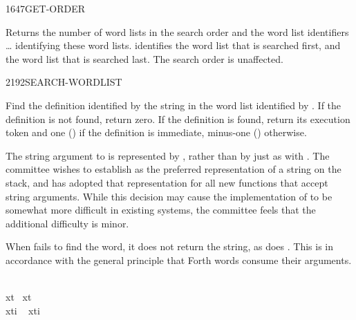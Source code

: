 \begin{worddef}{1647}{GET-ORDER}
\item {}

	Returns the number of word lists  in the search order
	and the word list identifiers  {\ldots} 
	identifying these word lists.  identifies the word
	list that is searched first, and  the word list that
	is searched last. The search order is unaffected.
\end{worddef}


\begin{worddef}{2192}{SEARCH-WORDLIST}
\item {}

	Find the definition identified by the string  in
	the word list identified by . If the definition is not
	found, return zero. If the definition is found, return its
	execution token  and one () if the definition is
	immediate, minus-one () otherwise.

\see {}

	\begin{rationale} %
		The string argument to  is represented
		by , rather than by just  as
		with . The committee wishes to establish
		 as the preferred representation of a string
		on the stack, and has adopted that representation for all new
		functions that accept string arguments. While this decision
		may cause the implementation of  to be
		somewhat more difficult in existing systems, the committee
		feels that the additional difficulty is minor.

		When  fails to find the word, it does
		not return the string, as does . This is in
		accordance with the general principle that Forth words consume
		their arguments.
	\end{rationale}

	\begin{testing}\ttfamily
		   \\
		 xt~   xt~ \word{!} \\
		 xti  ~ xti \word{!}  

		 \\
		 \\
	\end{testing}
\end{worddef}


